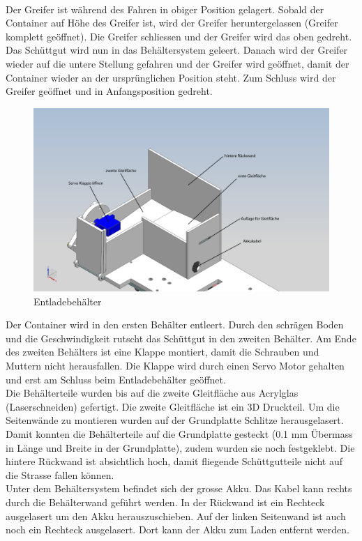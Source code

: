\\
Der Greifer ist während des Fahren in obiger Position gelagert. Sobald der Container auf Höhe des Greifer ist, wird der Greifer heruntergelassen (Greifer komplett geöffnet). Die Greifer schliessen und der Greifer wird das oben gedreht. Das Schüttgut wird nun in das Behältersystem geleert. Danach wird der Greifer wieder auf die untere Stellung gefahren und der Greifer wird geöffnet, damit der Container wieder an der ursprünglichen Position steht. Zum Schluss wird der Greifer geöffnet und in Anfangsposition gedreht.\\[0.2cm]
\begin{figure}[H]
\centering
\includegraphics[width=1\textwidth]{03_Loesungskonzept/pictures/entladen11.png}
\caption{Entladebehälter}
\end{figure}
Der Container wird in den ersten Behälter entleert. Durch den schrägen Boden und die Geschwindigkeit rutscht das Schüttgut in den zweiten Behälter. Am Ende des zweiten Behälters ist eine Klappe montiert, damit die Schrauben und Muttern nicht herausfallen. Die Klappe wird durch einen Servo Motor gehalten und erst am Schluss beim Entladebehälter geöffnet.\\[0.2cm]
Die Behälterteile wurden bis auf die zweite Gleitfläche aus Acrylglas (Laserschneiden) gefertigt. Die zweite Gleitfläche ist ein 3D Druckteil.
Um die Seitenwände zu montieren wurden auf der Grundplatte Schlitze herausgelasert. Damit konnten die Behälterteile auf die Grundplatte gesteckt (0.1 mm Übermass in Länge und Breite in der Grundplatte), zudem wurden sie noch festgeklebt. Die hintere Rückwand ist absichtlich hoch, damit fliegende Schüttgutteile nicht auf die Strasse fallen können.\\[0.2cm] 
Unter dem Behältersystem befindet sich der grosse Akku. Das Kabel kann rechts durch die Behälterwand geführt werden. In der Rückwand ist ein Rechteck ausgelasert um den Akku herauszuschieben. Auf der linken Seitenwand ist auch noch ein Rechteck ausgelasert. Dort kann der Akku zum Laden entfernt werden.
